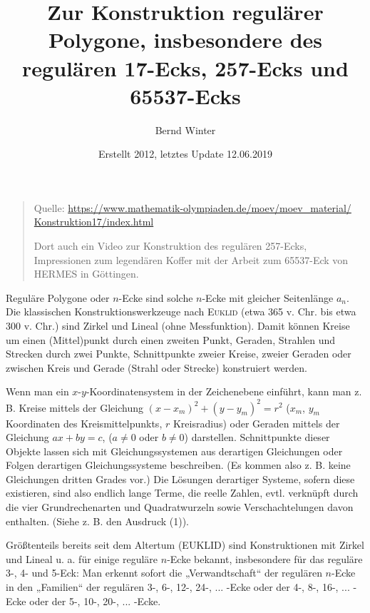 \documentclass[11pt]{article}
\author{Bernd Winter}
\title{Zur Konstruktion regulärer Polygone, insbesondere des regulären
  17-Ecks, 257-Ecks und 65537-Ecks}
\date{Erstellt 2012, letztes Update 12.06.2019}
\newcommand{\br}[1]{\ensuremath{\left(#1\right)}}
\begin{document}
 
\maketitle         
\begin{quote}
  Quelle: \url{https://www.mathematik-olympiaden.de/moev/moev_material/}\\
  \url{Konstruktion17/index.html}

  Dort auch ein Video zur Konstruktion des regulären 257-Ecks, Impressionen
  zum legendären Koffer mit der Arbeit zum 65537-Eck von HERMES in Göttingen. 
\end{quote}

Reguläre Polygone oder $n$-Ecke sind solche $n$-Ecke mit gleicher Seitenlänge
$a_n$.  Die klassischen Konstruktionswerkzeuge nach \textsc{Euklid} (etwa 365
v. Chr. bis etwa 300 v. Chr.) sind Zirkel und Lineal (ohne Messfunktion).
Damit können Kreise um einen (Mittel)punkt durch einen zweiten Punkt, Geraden,
Strahlen und Strecken durch zwei Punkte, Schnittpunkte zweier Kreise, zweier
Geraden oder zwischen Kreis und Gerade (Strahl oder Strecke) konstruiert
werden.

Wenn man ein $x$-$y$-Koordinatensystem in der Zeichenebene einführt, kann man
z. B. Kreise mittels der Gleichung $\br{x-x_m}^2+\br{y-y_m}^2=r^2$ ($x_m$,
$y_m$ Koordinaten des Kreismittelpunkts, $r$ Kreisradius) oder Geraden mittels
der Gleichung $ax + by = c$, ($a \neq 0$ oder $b \neq 0$) darstellen.
Schnittpunkte dieser Objekte lassen sich mit Gleichungssystemen aus derartigen
Gleichungen oder Folgen derartigen Gleichungssysteme beschreiben. (Es kommen
also z. B. keine Gleichungen dritten Grades vor.) Die Lösungen derartiger
Systeme, sofern diese existieren, sind also endlich lange Terme, die reelle
Zahlen, evtl. verknüpft durch die vier Grundrechenarten und Quadratwurzeln
sowie Verschachtelungen davon enthalten. (Siehe z. B. den Ausdruck (1)).

Größtenteils bereits seit dem Altertum (EUKLID) sind Konstruktionen mit Zirkel
und Lineal u. a. für einige reguläre $n$-Ecke bekannt, insbesondere für das
reguläre 3-, 4- und 5-Eck: Man erkennt sofort die „Verwandtschaft“ der
regulären $n$-Ecke in den „Familien“ der regulären 3-, 6-, 12-, 24-, ... -Ecke
oder der 4-, 8-, 16-, ... -Ecke oder der 5-, 10-, 20-, ... -Ecke.
\end{document}
